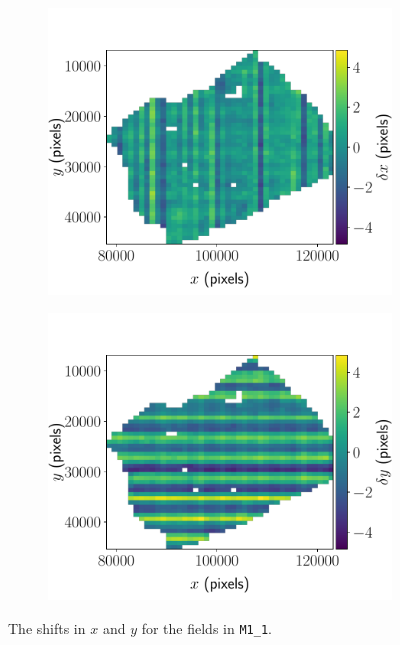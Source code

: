 \documentclass{article}
\newcommand{\M}[2]{\texttt{M#1\_#2}}
\begin{document}
\begin{figure}[ht]
	\centering
	\begin{subfigure}{0.49\linewidth}
		\includegraphics[width=\linewidth]{2D-shifts-JHUVectra-x}
		\caption{}
		\label{fig:2Dvectrax}
	\end{subfigure}
	\begin{subfigure}{0.49\linewidth}
		\includegraphics[width=\linewidth]{2D-shifts-JHUVectra-y}
		\caption{}
		\label{fig:2Dvectray}
	\end{subfigure}
	\caption{The shifts in  $x$ and  $y$ for the fields in \M11.}
	\label{fig:2Dvectra}
\end{figure}
\end{document}
